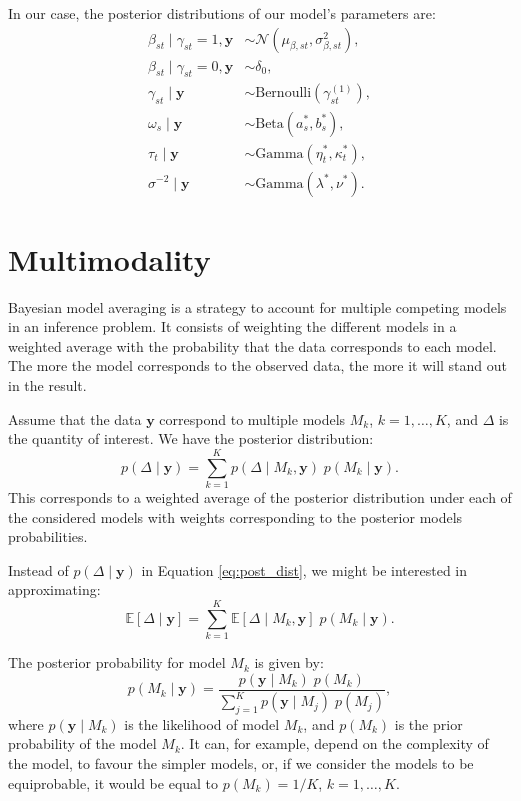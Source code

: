 \documentclass[a4paper, 11pt]{report}
\numberwithin{equation}{chapter}
\begin{document}
In our case, the posterior distributions of our model's parameters are:
\begin{align*}
\beta_{st} \mid \gamma_{st} = 1, \boldsymbol{y} &\sim \mathcal{N}\left(\mu_{\beta, st},\sigma^2_{\beta, st}\right),\\
\beta_{st} \mid \gamma_{st} = 0, \boldsymbol{y} &\sim \delta_0,\\
\gamma_{st} \mid \boldsymbol{y} &\sim \text{Bernoulli}(\gamma_{st}^{(1)}),\\
\omega_s\mid\boldsymbol{y} &\sim \text{Beta}(a_s^*,b_s^*),\\
\tau_t\mid \boldsymbol{y} &\sim \text{Gamma}(\eta^*_t, \kappa^*_t),\\
\sigma^{-2} \mid \boldsymbol{y} &\sim \text{Gamma}(\lambda^*, \nu^*).
\end{align*}

\newpage
\chapter{Multimodality}

Bayesian model averaging is a strategy to account for multiple competing models in an inference problem. It consists of weighting the different models in a weighted average with the probability that the data corresponds to each model. The more the model corresponds to the observed data, the more it will stand out in the result.

Assume that the data $\boldsymbol{y}$ correspond to multiple models $M_k$, $k= 1,\ldots,K$, and $\Delta$ is the quantity of interest. We have the posterior distribution:
\begin{equation}
p(\Delta \mid \boldsymbol{y}) = \sum_{k=1}^K p(\Delta \mid M_k,\boldsymbol{y}) \; p(M_k \mid \boldsymbol{y}).
\label{eq:post_dist}
\end{equation}
This corresponds to a weighted average of the posterior distribution under each of the considered models with weights corresponding to the posterior models probabilities.

Instead of $p(\Delta \mid \boldsymbol{y})$ in Equation \ref{eq:post_dist}, we might be interested in approximating:
\begin{equation*}
\mathbb{E}\left[\Delta \mid \boldsymbol{y}\right] = \sum_{k=1}^K\mathbb{E}\left[\Delta \mid M_k, \boldsymbol{y}\right]\;p(M_k \mid \boldsymbol{y}).
\end{equation*}

The posterior probability for model $M_k$ is given by:
\begin{equation}
p(M_k \mid \boldsymbol{y}) = \frac{p(\boldsymbol{y} \mid M_k)\; p(M_k)}{\sum_{j=1}^K p(\boldsymbol{y} \mid M_j)\; p(M_j)},
\label{eq:post_prob}
\end{equation}
where $p(\boldsymbol{y} \mid M_k)$ is the likelihood of model $M_k$, and $p(M_k)$ is the prior probability of the model $M_k$. It can, for example, depend on the complexity of the model, to favour the simpler models, or, if we consider the models to be equiprobable, it would be equal to $p(M_k) = 1/K$, $k = 1,\ldots,K$.  
\end{document}

